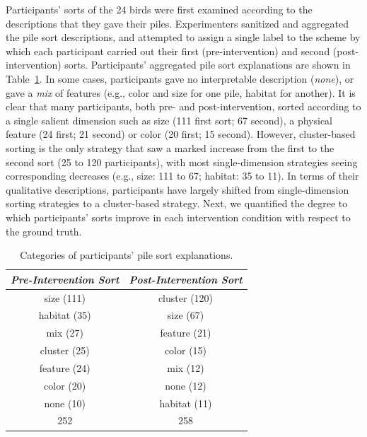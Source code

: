 \documentclass[10pt,letterpaper]{article}
\begin{document}
Participants' sorts of the 24 birds were first examined according to the descriptions that they gave their piles.
Experimenters sanitized and aggregated the pile sort descriptions, and attempted to assign a single label to the scheme by which each participant carried out their first (pre-intervention) and second (post-intervention) sorts.
Participants' aggregated pile sort explanations are shown in Table~\ref{tab:sorts}.
In some cases, participants gave no interpretable description (\emph{none}), or gave a \emph{mix} of features (e.g., color and size for one pile, habitat for another).
It is clear that many participants, both pre- and post-intervention, sorted according to a single salient dimension such as size (111 first sort; 67 second), a physical feature (24 first; 21 second) or color (20 first; 15 second).
However, cluster-based sorting is the only strategy that saw a marked increase from the first to the second sort (25 to 120 participants), with most single-dimension strategies seeing corresponding decreases (e.g., size: 111 to 67; habitat: 35 to 11).
In terms of their qualitative descriptions, participants have largely shifted from single-dimension sorting strategies to a cluster-based strategy. 
Next, we quantified the degree to which participants' sorts improve in each intervention condition with respect to the ground truth.

\begin{table}
\begin{center}
\begin{tabular}{ |c|c| } 
 \hline
 {\em Pre-Intervention Sort} & {\em Post-Intervention Sort}  \\ \hline
 size (111) & cluster (120)  \\ 
 habitat (35) & size (67)  \\      
 mix (27) & feature (21) \\
 cluster (25) & color (15) \\
 feature (24) & mix (12) \\
 color (20) & none (12) \\
 none (10) & habitat (11) \\
 \hline
 252  & 258  \\  
 \hline
\end{tabular}
\end{center}
\caption{Categories of participants' pile sort explanations.}
    \label{tab:sorts}
\end{table}
\end{document}
